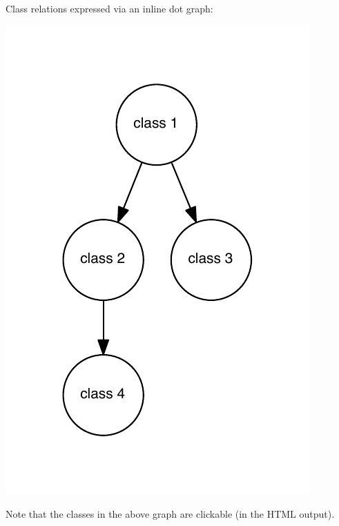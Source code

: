 Class relations expressed via an inline dot graph\+: 
\begin{DoxyImageNoCaption}
  \mbox{\includegraphics[width=\textwidth,height=\textheight/2,keepaspectratio=true]{dot_inline_dotgraph_1}}
\end{DoxyImageNoCaption}
 Note that the classes in the above graph are clickable (in the H\+T\+ML output). 